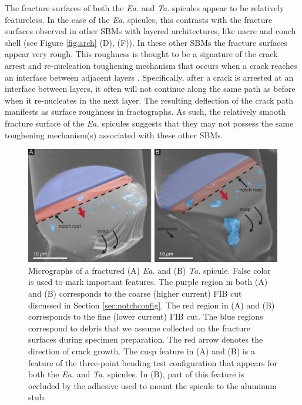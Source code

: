 \documentclass[12pt,onecolumn]{article}
\makeatletter
\newcommand{\TA}{\textit{Ta.\@}\xspace}
\newcommand{\EA}{\textit{Ea.\@}\xspace}
\makeatother
\begin{document}
\begin{bibunit}
 The fracture surfaces of both the \EA and \TA spicules appear to be relatively featureless. In the case of the \EA spicules, this contrasts with the fracture surfaces observed in other SBMs with layered architectures, like nacre and conch shell (see Figure \ref{fig:arch} (D), (F)). In these other SBMs the fracture surfaces appear very rough. This roughness is thought to be a signature of the crack arrest and re-nucleation toughening mechanism that occurs when a crack reaches an interface between adjacent layers \cite{karambelas2013strombus, koester2008true,liu2000bending,barthelat2009review}. Specifically, after a crack is arrested at an interface between layers, it often will not continue along the same path as before when it re-nucleates in the next layer. The resulting deflection of the crack path manifests as surface roughness in fractographs. As such, the relatively smooth fracture surface of the \EA spicules suggests that they may not possess the same toughening mechanism(s) associated with these other SBMs.
%
\begin{figure}[hb!]
			\centering
			\includegraphics[width=\textwidth]{../Figures/FigureFract/Figure4_V4B.pdf}
			\caption{Micrographs of a fractured (A) \EA and (B) \TA spicule. False color is used to mark important features. The purple region in both (A) and (B) corresponds to the coarse (higher current) FIB cut discussed in Section \ref{sec:notchconfig}. The red region in (A) and (B) corresponds to the fine (lower current) FIB cut. The blue regions correspond to debris that we assume collected on the fracture surfaces during specimen preparation. The red arrow denotes the direction of crack growth. The cusp feature in (A) and (B) is a feature of the three-point bending test configuration that appears for both the \EA and \TA spicules. In (B), part of this feature is occluded by the adhesive used to mount the spicule to the aluminum stub.}
			\label{fig:fract}
			\end{figure}


\end{bibunit}
\end{document}
